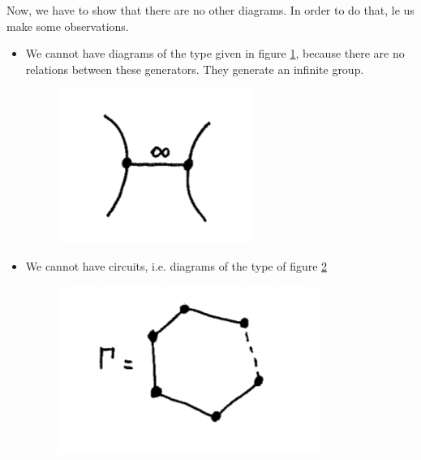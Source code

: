 Now, we have to show that there are no other diagrams. In order to do that, le us make some observations.
\begin{itemize}
\item We cannot have diagrams of the type given in figure \ref{cours9fig2}, because there are no relations between these generators. They generate an infinite group.

\begin{figure}[h!]
\centering
\includegraphics[scale=0.6]{cours9fig2.png}
\caption{}
\label{cours9fig2}
\end{figure}

\item We cannot have circuits, i.e. diagrams of the type of figure \ref{cours9fig3}


\begin{figure}[h!]
\centering
\includegraphics[scale=0.6]{cours9fig3.png}
\caption{}
\label{cours9fig3}
\end{figure}


\end{itemize}

